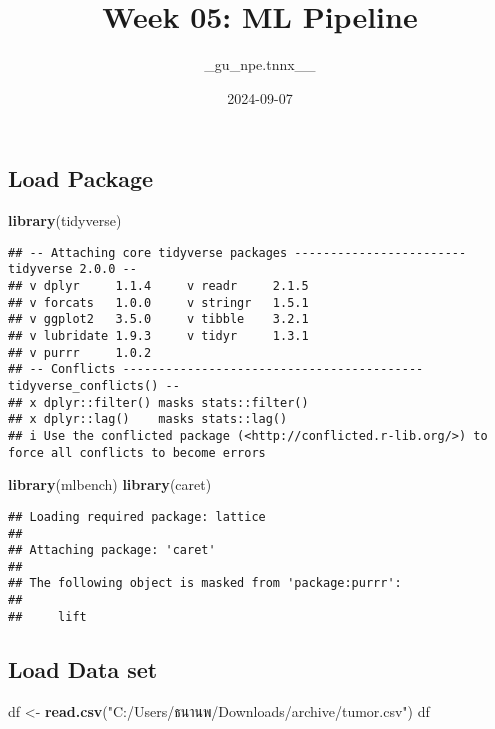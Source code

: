 \documentclass[
]{article}
\title{Week 05: ML Pipeline}
\author{\_gu\_npe.tnnx\_\_}
\date{2024-09-07}
\newenvironment{Shaded}{\begin{snugshade}}{\end{snugshade}}
\newcommand{\FunctionTok}[1]{\textcolor[rgb]{0.13,0.29,0.53}{\textbf{#1}}}
\newcommand{\NormalTok}[1]{#1}
\newcommand{\OtherTok}[1]{\textcolor[rgb]{0.56,0.35,0.01}{#1}}
\newcommand{\StringTok}[1]{\textcolor[rgb]{0.31,0.60,0.02}{#1}}
\begin{document}
\maketitle

\subsection{Load Package}\label{load-package}

\begin{Shaded}
\begin{Highlighting}[]
\FunctionTok{library}\NormalTok{(tidyverse)}
\end{Highlighting}
\end{Shaded}

\begin{verbatim}
## -- Attaching core tidyverse packages ------------------------ tidyverse 2.0.0 --
## v dplyr     1.1.4     v readr     2.1.5
## v forcats   1.0.0     v stringr   1.5.1
## v ggplot2   3.5.0     v tibble    3.2.1
## v lubridate 1.9.3     v tidyr     1.3.1
## v purrr     1.0.2     
## -- Conflicts ------------------------------------------ tidyverse_conflicts() --
## x dplyr::filter() masks stats::filter()
## x dplyr::lag()    masks stats::lag()
## i Use the conflicted package (<http://conflicted.r-lib.org/>) to force all conflicts to become errors
\end{verbatim}

\begin{Shaded}
\begin{Highlighting}[]
\FunctionTok{library}\NormalTok{(mlbench)}
\FunctionTok{library}\NormalTok{(caret)}
\end{Highlighting}
\end{Shaded}

\begin{verbatim}
## Loading required package: lattice
## 
## Attaching package: 'caret'
## 
## The following object is masked from 'package:purrr':
## 
##     lift
\end{verbatim}

\subsection{Load Data set}\label{load-data-set}

\begin{Shaded}
\begin{Highlighting}[]
\NormalTok{df }\OtherTok{\textless{}{-}} \FunctionTok{read.csv}\NormalTok{(}\StringTok{"C:/Users/ธนานพ/Downloads/archive/tumor.csv"}\NormalTok{)}
\NormalTok{df}
\end{Highlighting}
\end{Shaded}
\end{document}
